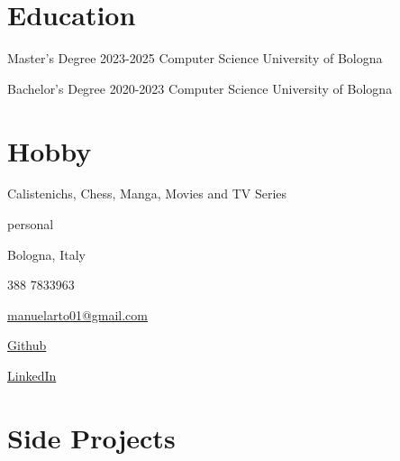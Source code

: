 \documentclass{tccv}
\begin{document}
\section{Education}

\begin{yearlist}

\item[Master's Degree]{2023-2025}
     {Computer Science}
     {University of Bologna}

\item[Bachelor's Degree]{2020-2023}
    {Computer Science}
    {University of Bologna}

\end{yearlist}

\section{Hobby}

Calistenichs, Chess, Manga, Movies and TV Series


\newpage

\begin{keyvaluelist}{personal}
    \item[\faHome] Bologna, Italy
    \item[\faPhone] 388 7833963
    \item[\faEnvelope] \href{mailto:manuelarto01@gmail.com}{manuelarto01@gmail.com}
    \item[\faGithub] \href{https://github.com/manuelarto}{Github}
    \item[\faLinkedin] \href{https://www.linkedin.com/in/manuel-arto-696012203/}{LinkedIn}
\end{keyvaluelist}


\section{Side Projects}
\end{document}
